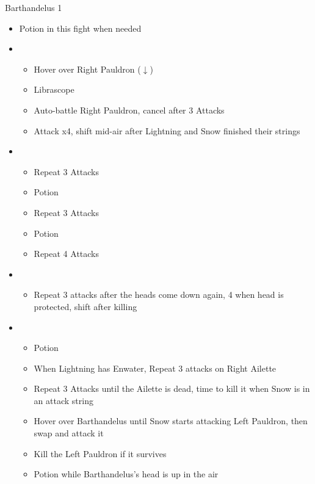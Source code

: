 \begin{paracol}{2}
\begin{battle}{Barthandelus 1}
		\begin{itemize}
			\item Potion in this fight when needed
			\item \first
			      \begin{itemize}
				      \item Hover over Right Pauldron ($\downarrow$)
				      \item Librascope
				      \item Auto-battle Right Pauldron, cancel after 3 Attacks
				      \item Attack x4, shift mid-air after Lightning and Snow finished their strings
			      \end{itemize}
			\item \fifth
			      \begin{itemize}
				      \item Repeat 3 Attacks
				      \item Potion
				      \item Repeat 3 Attacks
				      \item Potion
				      \item Repeat 4 Attacks
			      \end{itemize}
			\item \fourth
			      \begin{itemize}
				      \item Repeat 3 attacks after the heads come down again, 4 when head is protected, shift after killing
			      \end{itemize}
			\item \first
			      \begin{itemize}
				      \item Potion
				      \item When Lightning has Enwater, Repeat 3 attacks on Right Ailette
				      \item Repeat 3 Attacks until the Ailette is dead, time to kill it when Snow is in an attack string
				      \item Hover over Barthandelus until Snow starts attacking Left Pauldron, then swap and attack it
				      \item Kill the Left Pauldron if it survives
				      \item Potion while Barthandelus's head is up in the air
			      \end{itemize}


\end{itemize}
\end{battle}
\end{paracol}
